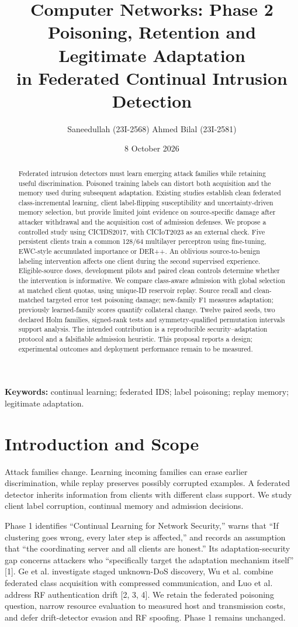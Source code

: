 \documentclass[10pt,a4paper]{article}
\title{\textbf{Computer Networks: Phase 2}\\[5pt]
Poisoning, Retention and Legitimate Adaptation\\
in Federated Continual Intrusion Detection}
\author{Saneedullah (23I-2568) \qquad Ahmed Bilal (23I-2581)}
\date{8 October 2026}
\begin{document}
\maketitle
\begin{abstract}
Federated intrusion detectors must learn emerging attack families while retaining useful discrimination. Poisoned training labels can distort both acquisition and the memory used during subsequent adaptation. Existing studies establish clean federated class-incremental learning, client label-flipping susceptibility and uncertainty-driven memory selection, but provide limited joint evidence on source-specific damage after attacker withdrawal and the acquisition cost of admission defenses. We propose a controlled study using CICIDS2017, with CICIoT2023 as an external check. Five persistent clients train a common 128/64 multilayer perceptron using fine-tuning, EWC-style accumulated importance or DER++. An oblivious source-to-benign labeling intervention affects one client during the second supervised experience. Eligible-source doses, development pilots and paired clean controls determine whether the intervention is informative. We compare class-aware admission with global selection at matched client quotas, using unique-ID reservoir replay. Source recall and clean-matched targeted error test poisoning damage; new-family F1 measures adaptation; previously learned-family scores quantify collateral change. Twelve paired seeds, two declared Holm families, signed-rank tests and symmetry-qualified permutation intervals support analysis. The intended contribution is a reproducible security--adaptation protocol and a falsifiable admission heuristic. This proposal reports a design; experimental outcomes and deployment performance remain to be measured.
\end{abstract}
\noindent\textbf{Keywords:} continual learning; federated IDS; label poisoning; replay memory; legitimate adaptation.

\section{Introduction and Scope}
Attack families change. Learning incoming families can erase earlier discrimination, while replay preserves possibly corrupted examples. A federated detector inherits information from clients with different class support. We study client label corruption, continual memory and admission decisions.

Phase 1 identifies ``Continual Learning for Network Security,'' warns that ``If clustering goes wrong, every later step is affected,'' and records an assumption that ``the coordinating server and all clients are honest.'' Its adaptation-security gap concerns attackers who ``specifically target the adaptation mechanism itself'' [1]. Ge et al. investigate staged unknown-DoS discovery, Wu et al. combine federated class acquisition with compressed communication, and Luo et al. address RF authentication drift [2, 3, 4]. We retain the federated poisoning question, narrow resource evaluation to measured host and transmission costs, and defer drift-detector evasion and RF spoofing. Phase 1 remains unchanged.
\end{document}
